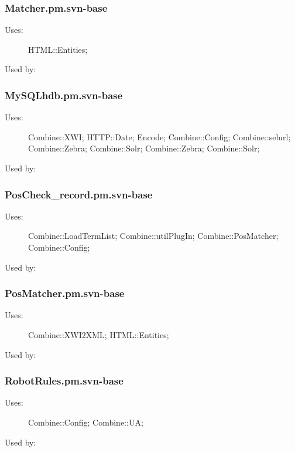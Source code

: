 \subsubsection{Matcher.pm.svn-base}
\begin{description}
\item[Uses:] HTML::Entities; 

\item[Used by:] 

\end{description}
\subsubsection{MySQLhdb.pm.svn-base}
\begin{description}
\item[Uses:] Combine::XWI; HTTP::Date; Encode; Combine::Config; Combine::selurl; Combine::Zebra; Combine::Solr; Combine::Zebra; Combine::Solr; 

\item[Used by:] 

\end{description}
\subsubsection{PosCheck\_record.pm.svn-base}
\begin{description}
\item[Uses:] Combine::LoadTermList; Combine::utilPlugIn; Combine::PosMatcher; Combine::Config; 

\item[Used by:] 

\end{description}
\subsubsection{PosMatcher.pm.svn-base}
\begin{description}
\item[Uses:] Combine::XWI2XML; HTML::Entities; 

\item[Used by:] 

\end{description}
\subsubsection{RobotRules.pm.svn-base}
\begin{description}
\item[Uses:] Combine::Config; Combine::UA; 

\item[Used by:] 

\end{description}
